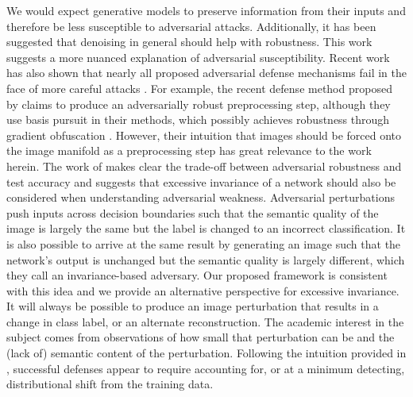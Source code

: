 We would expect generative models to preserve information from their inputs and therefore be less susceptible to adversarial attacks.
Additionally, it has been suggested that denoising in general should help with robustness.
This work suggests a more nuanced explanation of adversarial susceptibility.
Recent work has also shown that nearly all proposed adversarial defense mechanisms fail in the face of more careful attacks \parencite{carlini2017towards, athalye2018obfuscated}.
For example, the recent defense method proposed by \cite{sun2018adversarial} claims to produce an adversarially robust preprocessing step, although they use basis pursuit in their methods, which possibly achieves robustness through gradient obfuscation \parencite{athalye2018obfuscated}.
However, their intuition that images should be forced onto the image manifold as a preprocessing step has great relevance to the work herein.
The work of \cite{jacobsen2018excessive} makes clear the trade-off between adversarial robustness and test accuracy and suggests that excessive invariance of a network should also be considered when understanding adversarial weakness.
Adversarial perturbations push inputs across decision boundaries such that the semantic quality of the image is largely the same but the label is changed to an incorrect classification.
It is also possible to arrive at the same result by generating an image such that the network's output is unchanged but the semantic quality is largely different, which they call an invariance-based adversary.
Our proposed framework is consistent with this idea and we provide an alternative perspective for excessive invariance.
It will always be possible to produce an image perturbation that results in a change in class label, or an alternate reconstruction.
The academic interest in the subject comes from observations of how small that perturbation can be and the (lack of) semantic content of the perturbation.
Following the intuition provided in \parencite{ford2019adversarial}, successful defenses appear to require accounting for, or at a minimum detecting, distributional shift from the training data.


